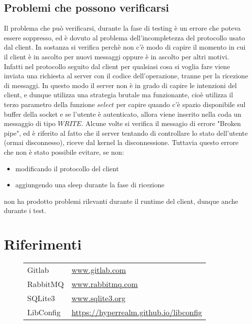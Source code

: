 \documentclass[]{article}
\begin{document}
\subsection{Problemi che possono verificarsi}
Il problema che pu\`o verificarsi, durante la fase di testing \`e un errore che poteva essere soppresso,
ed \`e dovuto al problema dell'incompletezza del protocollo usato dal client.
In sostanza si verifica perch\`e non c'\`e modo di capire il momento in cui il client \`e in ascolto per nuovi
messaggi oppure \`e in ascolto per altri motivi.
Infatti nel protocollo seguito dal client per qualsiasi cosa si voglia fare viene inviata una richiesta
al server con il codice dell'operazione, tranne per la ricezione di messaggi.
In questo modo il server non \`e in grado di capire le intenzioni del client, e dunque utilizza una
strategia brutale ma funzionante, cio\`e utilizza il terzo parametro della funzione $select$ per capire
quando c'\`e spazio disponibile sul buffer della socket e se l'utente \`e autenticato, allora
viene inserito nella coda un messaggio di tipo $WRITE$. Alcune volte si verifica il messagio di 
errore "Broken pipe", ed \`e riferito al fatto che il server tentando di controllare lo stato dell'utente
(ormai disconnesso), riceve dal kernel la disconnessione.
Tuttavia questo errore che non \`e stato possibile evitare, se non:
\begin{itemize}
	\item modificando il protocollo del client
	\item aggiungendo una sleep durante la fase di ricezione
\end{itemize}
non ha prodotto problemi rilevanti durante il runtime del client, dunque anche durante i test.

\pagebreak

\section{Riferimenti}
\begin{figure}[H]
	\begin{table}[H]
		\begin{tabular}{ll}
			Gitlab & \url{www.gitlab.com} \\
			RabbitMQ & \url{www.rabbitmq.com} \\
			SQLite3 & \url{www.sqlite3.org} \\
			LibConfig & \url{https://hyperrealm.github.io/libconfig} \\
		\end{tabular}
	\end{table}
\end{figure}
\end{document}

